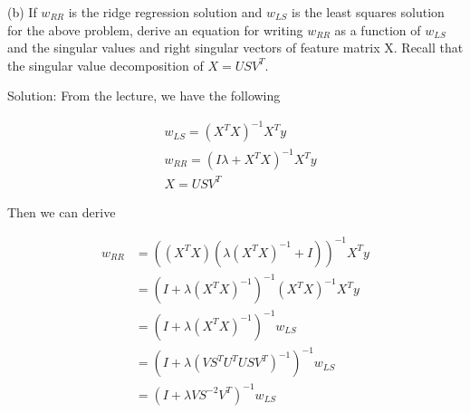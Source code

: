 \documentclass[11pt]{report}
\begin{document}
\pagebreak

(b) If $w_{RR}$ is the ridge regression solution and $w_{LS}$ is the least squares solution for the above problem,
derive an equation for writing $w_{RR}$ as a function of $w_{LS}$ and the singular values and right singular vectors
of feature matrix X. Recall that the singular value decomposition of $X = USV^T$.
\begin{flushleft}
Solution: From the lecture, we have the following
\end{flushleft}
\begin{align*}
&w_{LS} = (X^T X)^{-1} X^T y \\
&w_{RR} = (I \lambda + X^T X)^{-1} X^T y \\
&X = USV^T
\end{align*}

\begin{flushleft}
Then we can derive
\end{flushleft}
\begin{equation*}
\begin{split}
w_{RR} &= ((X^TX) (\lambda (X^TX)^{-1} + I))^{-1} X^T y \\
&= (I + \lambda (X^TX)^{-1})^{-1} (X^TX)^{-1} X^T y \\
&= (I + \lambda (X^TX)^{-1})^{-1} w_{LS} \\
&= (I + \lambda (V S^T U^T U S V^T)^{-1})^{-1} w_{LS} \\
&= (I + \lambda V S^{-2} V^T)^{-1} w_{LS} \\
\end{split} 
\end{equation*}
\end{document}
